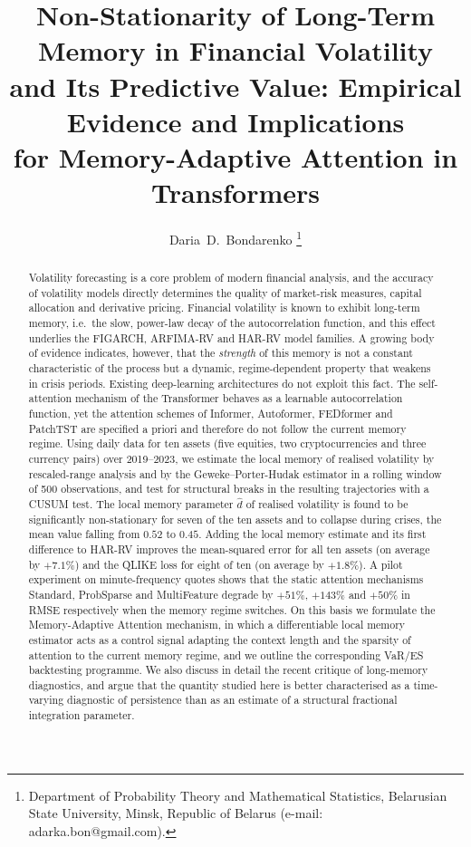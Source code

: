 \documentclass[journal]{IEEEtran}
\begin{document}
\title{Non-Stationarity of Long-Term Memory in Financial Volatility\\
and Its Predictive Value: Empirical Evidence and Implications\\
for Memory-Adaptive Attention in Transformers}

\author{Daria~D.~Bondarenko%
\thanks{Department of Probability Theory and Mathematical Statistics, Belarusian State
University, Minsk, Republic of Belarus (e-mail: adarka.bon@gmail.com).}}

\maketitle

\begin{abstract}
Volatility forecasting is a core problem of modern financial analysis, and the accuracy of
volatility models directly determines the quality of market-risk measures, capital allocation
and derivative pricing. Financial volatility is known to exhibit long-term memory, i.e.\ the slow,
power-law decay of the autocorrelation function, and this effect underlies the FIGARCH,
ARFIMA-RV and HAR-RV model families. A growing body of evidence indicates, however, that the
\emph{strength} of this memory is not a constant characteristic of the process but a dynamic,
regime-dependent property that weakens in crisis periods. Existing deep-learning architectures do
not exploit this fact. The self-attention mechanism of the Transformer behaves as a learnable
autocorrelation function, yet the attention schemes of Informer, Autoformer, FEDformer and
PatchTST are specified a priori and therefore do not follow the current memory regime. Using daily
data for ten assets (five equities, two cryptocurrencies and three currency pairs) over
2019--2023, we estimate the local memory of realised volatility by rescaled-range analysis and by
the Geweke--Porter-Hudak estimator in a rolling window of 500 observations, and test for
structural breaks in the resulting trajectories with a CUSUM test. The local memory parameter
$\hat d$ of realised volatility is found to be significantly non-stationary for seven of the ten
assets and to collapse during crises, the mean value falling from $0.52$ to $0.45$. Adding the
local memory estimate and its first difference to HAR-RV improves the mean-squared error for all
ten assets (on average by $+7.1\%$) and the QLIKE loss for eight of ten (on average by
$+1.8\%$). A pilot experiment on minute-frequency quotes shows that the static attention
mechanisms Standard, ProbSparse and MultiFeature degrade by $+51\%$, $+143\%$ and $+50\%$ in
RMSE respectively when the memory regime switches. On this basis we formulate the
Memory-Adaptive Attention mechanism, in which a differentiable local memory estimator acts as a
control signal adapting the context length and the sparsity of attention to the current memory
regime, and we outline the corresponding VaR/ES backtesting programme. We also discuss in detail
the recent critique of long-memory diagnostics, and argue that the quantity studied here is
better characterised as a time-varying diagnostic of persistence than as an estimate of a
structural fractional integration parameter.
\end{abstract}
\end{document}
